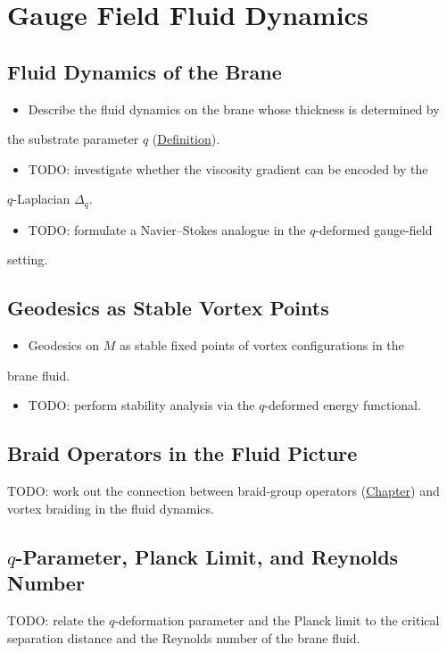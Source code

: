 \chapter{Gauge Field Fluid Dynamics}
\label{chap:gauge-fluid}

\section{Fluid Dynamics of the Brane}
\label{sec:brane-fluid}

\begin{itemize}
  \item Describe the fluid dynamics on the brane whose thickness is determined by
\end{itemize}
  the substrate parameter $q$ (\hyperref[def:substrate-parameter]{Definition}).
\begin{itemize}
  \item TODO: investigate whether the viscosity gradient can be encoded by the
\end{itemize}
  $q$-Laplacian $\Delta_q$.
\begin{itemize}
  \item TODO: formulate a Navier--Stokes analogue in the $q$-deformed gauge-field
\end{itemize}
  setting.

\section{Geodesics as Stable Vortex Points}
\label{sec:geodesic-vortices}

\begin{itemize}
  \item Geodesics on $M$ as stable fixed points of vortex configurations in the
\end{itemize}
  brane fluid.
\begin{itemize}
  \item TODO: perform stability analysis via the $q$-deformed energy functional.
\end{itemize}

\section{Braid Operators in the Fluid Picture}
\label{sec:braid-fluid}

TODO: work out the connection between braid-group operators
(\hyperref[chap:path-integrals-braiding]{Chapter}) and vortex braiding in the fluid
dynamics.

\section{$q$-Parameter, Planck Limit, and Reynolds Number}
\label{sec:planck-reynolds}

TODO: relate the $q$-deformation parameter and the Planck limit to the
critical separation distance and the Reynolds number of the brane fluid.
